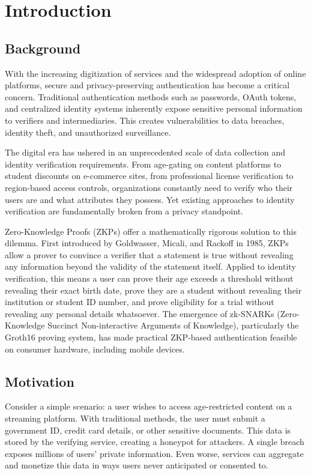 \chapter{Introduction}

\section{Background}

With the increasing digitization of services and the widespread adoption of online platforms, secure and privacy-preserving authentication has become a critical concern. Traditional authentication methods such as passwords, OAuth tokens, and centralized identity systems inherently expose sensitive personal information to verifiers and intermediaries. This creates vulnerabilities to data breaches, identity theft, and unauthorized surveillance.

The digital era has ushered in an unprecedented scale of data collection and identity verification requirements. From age-gating on content platforms to student discounts on e-commerce sites, from professional license verification to region-based access controls, organizations constantly need to verify who their users are and what attributes they possess. Yet existing approaches to identity verification are fundamentally broken from a privacy standpoint.

Zero-Knowledge Proofs (ZKPs) offer a mathematically rigorous solution to this dilemma. First introduced by Goldwasser, Micali, and Rackoff in 1985, ZKPs allow a prover to convince a verifier that a statement is true without revealing any information beyond the validity of the statement itself. Applied to identity verification, this means a user can prove their age exceeds a threshold without revealing their exact birth date, prove they are a student without revealing their institution or student ID number, and prove eligibility for a trial without revealing any personal details whatsoever. The emergence of zk-SNARKs (Zero-Knowledge Succinct Non-interactive Arguments of Knowledge), particularly the Groth16 proving system, has made practical ZKP-based authentication feasible on consumer hardware, including mobile devices.

\section{Motivation}

Consider a simple scenario: a user wishes to access age-restricted content on a streaming platform. With traditional methods, the user must submit a government ID, credit card details, or other sensitive documents. This data is stored by the verifying service, creating a honeypot for attackers. A single breach exposes millions of users' private information. Even worse, services can aggregate and monetize this data in ways users never anticipated or consented to.

